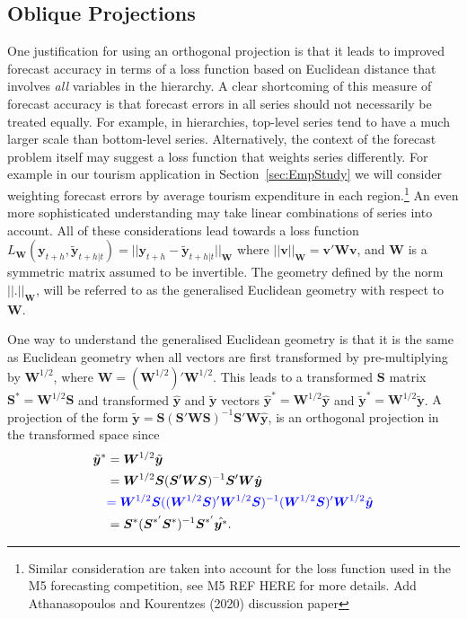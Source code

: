 \documentclass[12pt]{article}
\theoremstyle{definition}
\begin{document}
\subsection{Oblique Projections}\label{sec:oblique}

One justification for using an orthogonal projection is that it leads to improved forecast accuracy in terms of {\color{blue} a loss function based on Euclidean distance that involves \emph{all} variables in the hierarchy.} A clear shortcoming of this measure of forecast accuracy is that forecast errors in all series should not necessarily be treated equally. For example, in hierarchies, top-level series tend to have a much larger scale than bottom-level series.  {\color{blue} Alternatively, the context of the forecast problem itself may suggest a loss function that weights series differently.  For example in our tourism application in Section~\ref{sec:EmpStudy} we will consider weighting forecast errors by average tourism expenditure in each region.}\footnote{Similar consideration are taken into account for the loss function used in the M5 forecasting competition, see M5 REF HERE for more details. Add Athanasopoulos and Kourentzes (2020) discussion paper}  An even more sophisticated understanding may take {\color{blue}linear combinations} of series into account. All of these considerations lead towards {\color{blue} a loss function $L_{\bm W}(\bm{y}_{t+h},\tilde{\bm{y}}_{t+h|t})=||{\bm{y}_{t+h}-\tilde{\bm{y}}_{t+h|t}}||_{\bm{W}}$ where $||\bm{v}||_{\bm{W}}=\bm{v}'\bm{W}\bm{v}$, and $\bm{W}$ is a symmetric matrix assumed to be invertible.  The geometry defined by the norm $||.||_{\bm{W}}$, will be referred to as the generalised Euclidean geometry with respect to $\bm{W}$. }

One way to understand the generalised Euclidean geometry is that it is the same as Euclidean geometry when all vectors are first transformed by pre-multiplying by $\bm{W}^{1/2}$, {\color{blue} where $\bm{W}=(\bm{W}^{1/2})'\bm{W}^{1/2}$}. This leads to a transformed $\bm{S}$ matrix $\bm{S}^*=\bm{W}^{1/2}\bm{S}$ and transformed $\hat{\bm{y}}$ and $\tilde{\bm{y}}$ vectors $\hat{\bm{y}}^*=\bm{W}^{1/2}\hat{\bm{y}}$ and $\tilde{\bm{y}}^*=\bm{W}^{1/2}\tilde{\bm{y}}$. {\color{blue} A projection of the form $\tilde{\bm{y}}=\bm{S}(\bm{S}'\bm{W}\bm{S})^{-1}\bm{S}'\bm{W}\hat{\bm{y}}$, is an} orthogonal projection in the transformed space since
\begin{align*}
  \tilde{\bm{y}}^*
    & = \bm{W}^{1/2}\tilde{\bm{y}} \\
    & = \bm{W}^{1/2}\bm{S}(\bm{S}'\bm{W}\bm{S})^{-1}\bm{S}'\bm{W}\hat{\bm{y}} \\
    &{\color{blue} = \bm{W}^{1/2}\bm{S}((\bm{W}^{1/2}\bm{S})'\bm{W}^{1/2}\bm{S})^{-1}(\bm{W}^{1/2}\bm{S})'\bm{W}^{1/2}\hat{\bm{y}}}\\
    & = \bm{S}^*(\bm{S}^{*'}\bm{S}^*)^{-1}\bm{S}^{*'}\hat{\bm{y}^*}.
\end{align*}
\end{document}
